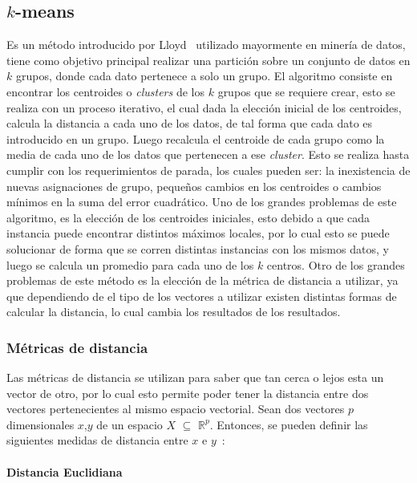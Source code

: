 	\subsection{$k$-means}
	\label{sec:k-means}
	Es un método introducido por Lloyd~\cite{Lloyd1982} utilizado mayormente en minería de datos, tiene como objetivo principal realizar una partición sobre un conjunto de datos en $k$ grupos, donde cada dato pertenece a solo un grupo.
	El algoritmo consiste en encontrar los centroides o \textit{clusters} de los $k$ grupos que se requiere crear, esto se realiza con un proceso iterativo, el cual dada la elección inicial de los centroides, calcula la distancia a cada uno de los datos, de tal forma que cada dato es introducido en un grupo. Luego recalcula el centroide de cada grupo como la media de cada uno de los datos que pertenecen a ese \textit{cluster}. Esto se realiza hasta cumplir con los requerimientos de parada, los cuales pueden ser: la inexistencia de nuevas asignaciones de grupo, pequeños cambios en los centroides o cambios mínimos en la suma del error cuadrático.
	Uno de los grandes problemas de este algoritmo, es la elección de los centroides iniciales, esto debido a que cada instancia puede encontrar distintos máximos locales, por lo cual esto se puede solucionar de forma que se corren distintas instancias con los mismos datos, y luego se calcula un promedio para cada uno de los $k$ centros.
	Otro de los grandes problemas de este método es la elección de la métrica de distancia a utilizar, ya que dependiendo de el tipo de los vectores a utilizar existen distintas formas de calcular la distancia, lo cual cambia los resultados de los resultados.
			
	\subsubsection{Métricas de distancia}
	\label{sec:matricas_de_distancia}
	Las métricas de distancia se utilizan para saber que tan cerca o lejos esta un vector de otro, por lo cual esto permite poder tener la distancia entre dos vectores pertenecientes al mismo espacio vectorial. 
	Sean dos vectores $p$ dimensionales $x$,$y$ de un espacio $X$ $\subseteq$ $\mathds{R}^p$. Entonces, se pueden definir las siguientes medidas de distancia entre $x$ e $y$~\cite{Pereira2010}:
	
\paragraph{Distancia Euclidiana}\label{deuclidiana}

